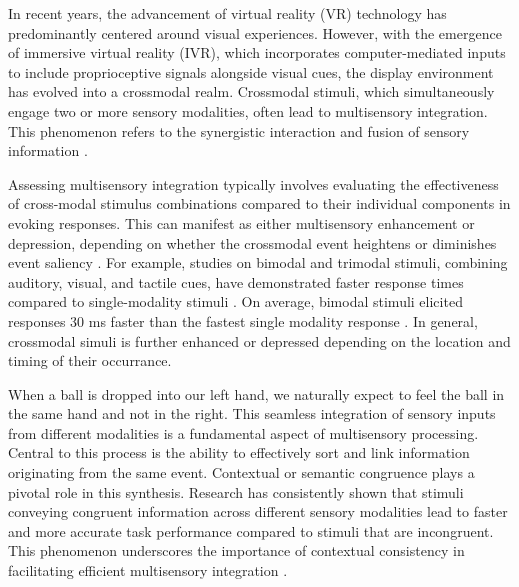 \documentclass[12pt,oneside,openright]{report}
\begin{document}
In recent years, the advancement of virtual reality (VR) technology has predominantly centered around visual experiences. However, with the emergence of immersive virtual reality (IVR), which incorporates computer-mediated inputs to include proprioceptive signals alongside visual cues, the display environment has evolved into a crossmodal realm. Crossmodal stimuli, which simultaneously engage two or more sensory modalities, often lead to multisensory integration. This phenomenon refers to the synergistic interaction and fusion of sensory information \parencite{Stein2008MultisensoryIC}.

Assessing multisensory integration typically involves evaluating the effectiveness of cross-modal stimulus combinations compared to their individual components in evoking responses. This can manifest as either multisensory enhancement or depression, depending on whether the crossmodal event heightens or diminishes event saliency \parencite{Stein2008MultisensoryIC}. For example, studies on bimodal and trimodal stimuli, combining auditory, visual, and tactile cues, have demonstrated faster response times compared to single-modality stimuli \parencite{Diederich2004BimodalAT}. On average, bimodal stimuli elicited responses 30 ms faster than the fastest single modality response \parencite{Diederich2004BimodalAT}. In general, crossmodal simuli is further enhanced or depressed depending on the location and timing of their occurrance.

When a ball is dropped into our left hand, we naturally expect to feel the ball in the same hand and not in the right. This seamless integration of sensory inputs from different modalities is a fundamental aspect of multisensory processing. Central to this process is the ability to effectively sort and link information originating from the same event. Contextual or semantic congruence plays a pivotal role in this synthesis. Research has consistently shown that stimuli conveying congruent information across different sensory modalities lead to faster and more accurate task performance compared to stimuli that are incongruent. This phenomenon underscores the importance of contextual consistency in facilitating efficient multisensory integration \parencite{Laurienti2003CrossmodalSP}.

\end{document}
